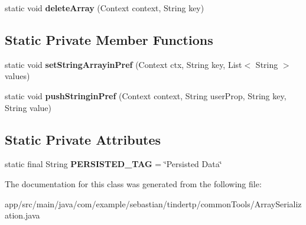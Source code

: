 \begin{DoxyCompactItemize}
\item 
static void {\bfseries delete\+Array} (Context context, String key)\hypertarget{classcom_1_1example_1_1sebastian_1_1tindertp_1_1commonTools_1_1ArraySerialization_aff839eb0d3fe622910d039c563634185}{}\label{classcom_1_1example_1_1sebastian_1_1tindertp_1_1commonTools_1_1ArraySerialization_aff839eb0d3fe622910d039c563634185}

\end{DoxyCompactItemize}
\subsection*{Static Private Member Functions}
\begin{DoxyCompactItemize}
\item 
static void {\bfseries set\+String\+Arrayin\+Pref} (Context ctx, String key, List$<$ String $>$ values)\hypertarget{classcom_1_1example_1_1sebastian_1_1tindertp_1_1commonTools_1_1ArraySerialization_a5e7b7c56bf40ca5344db9806615e81ca}{}\label{classcom_1_1example_1_1sebastian_1_1tindertp_1_1commonTools_1_1ArraySerialization_a5e7b7c56bf40ca5344db9806615e81ca}

\item 
static void {\bfseries push\+Stringin\+Pref} (Context context, String user\+Prop, String key, String value)\hypertarget{classcom_1_1example_1_1sebastian_1_1tindertp_1_1commonTools_1_1ArraySerialization_a3dce0719b510284da0bfc9e92e0defc9}{}\label{classcom_1_1example_1_1sebastian_1_1tindertp_1_1commonTools_1_1ArraySerialization_a3dce0719b510284da0bfc9e92e0defc9}

\end{DoxyCompactItemize}
\subsection*{Static Private Attributes}
\begin{DoxyCompactItemize}
\item 
static final String {\bfseries P\+E\+R\+S\+I\+S\+T\+E\+D\+\_\+\+T\+AG} = \char`\"{}Persisted Data\char`\"{}\hypertarget{classcom_1_1example_1_1sebastian_1_1tindertp_1_1commonTools_1_1ArraySerialization_ac97509cc0f256f877558c94a3c690ea5}{}\label{classcom_1_1example_1_1sebastian_1_1tindertp_1_1commonTools_1_1ArraySerialization_ac97509cc0f256f877558c94a3c690ea5}

\end{DoxyCompactItemize}


The documentation for this class was generated from the following file\+:\begin{DoxyCompactItemize}
\item 
app/src/main/java/com/example/sebastian/tindertp/common\+Tools/Array\+Serialization.\+java\end{DoxyCompactItemize}
